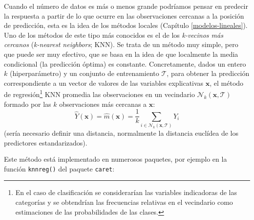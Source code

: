 \documentclass[
  spanish,
]{book}
\theoremstyle{break}
\theoremstyle{definition}
\theoremstyle{definition}
\theoremstyle{definition}
\theoremstyle{definition}
\theoremstyle{remark}
\begin{document}
Cuando el número de datos es más o menos grande podríamos pensar en predecir la respuesta a partir de lo que ocurre en las observaciones cercanas a la posición de predicción, esta es la idea de los métodos locales (Capítulo \ref{modelos-lineales}).
Uno de los métodos de este tipo más conocidos es el de los \emph{k-vecinos más cercanos} (\emph{k-nearest neighbors}; KNN).
Se trata de un método muy simple, pero que puede ser muy efectivo, que se basa en la idea de que localmente la media condicional (la predicción óptima) es constante.
Concretamente, dados un entero \(k\) (hiperparámetro) y un conjunto de entrenamiento \(\mathcal{T}\), para obtener la predicción correspondiente a un vector de valores de las variables explicativas \(\mathbf{x}\), el método de regresión\footnote{En el caso de clasificación se considerarían las variables indicadoras de las categorías y se obtendrían las frecuencias relativas en el vecindario como estimaciones de las probabilidades de las clases.} KNN promedia las observaciones en un vecindario \(\mathcal{N}_k(\mathbf{x}, \mathcal{T})\) formado por las \(k\) observaciones más cercanas a \(\mathbf{x}\):
\[\hat{Y}(\mathbf{x}) = \hat{m}(\mathbf{x}) = \frac{1}{k} \sum_{i \in \mathcal{N}_k(\mathbf{x}, \mathcal{T})} Y_i\]
(sería necesario definir una distancia, normalmente la distancia euclídea de los predictores estandarizados).

Este método está implementado en numerosos paquetes, por ejemplo en la función \texttt{knnreg()} del paquete \texttt{caret}:
\end{document}
